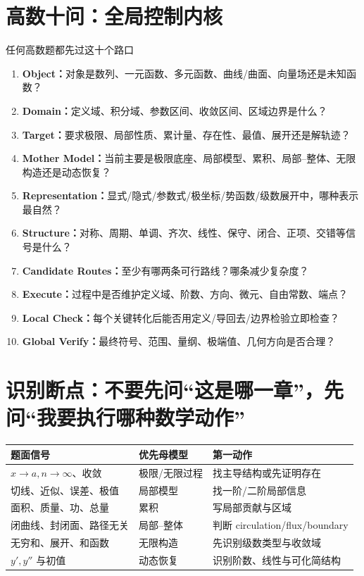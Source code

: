\documentclass[11pt,a4paper,openany]{ctexbook}
\newcommand{\key}[1]{\textbf{\color{deep}#1}}
\begin{document}
\section{高数十问：全局控制内核}
\begin{corebox}{任何高数题都先过这十个路口}
\begin{enumerate}
  \item \key{Object：}对象是数列、一元函数、多元函数、曲线/曲面、向量场还是未知函数？
  \item \key{Domain：}定义域、积分域、参数区间、收敛区间、区域边界是什么？
  \item \key{Target：}要求极限、局部性质、累计量、存在性、最值、展开还是解轨迹？
  \item \key{Mother Model：}当前主要是极限底座、局部模型、累积、局部--整体、无限构造还是动态恢复？
  \item \key{Representation：}显式/隐式/参数式/极坐标/势函数/级数展开中，哪种表示最自然？
  \item \key{Structure：}对称、周期、单调、齐次、线性、保守、闭合、正项、交错等信号是什么？
  \item \key{Candidate Routes：}至少有哪两条可行路线？哪条减少复杂度？
  \item \key{Execute：}过程中是否维护定义域、阶数、方向、微元、自由常数、端点？
  \item \key{Local Check：}每个关键转化后能否用定义/导回去/边界检验立即检查？
  \item \key{Global Verify：}最终符号、范围、量纲、极端值、几何方向是否合理？
\end{enumerate}
\end{corebox}

\section{识别断点：不要先问“这是哪一章”，先问“我要执行哪种数学动作”}
\begin{longtable}{L{3.0cm}L{5.0cm}L{\dimexpr\linewidth-8.17cm\relax}}
\toprule
\textbf{题面信号} & \textbf{优先母模型} & \textbf{第一动作}\\
\midrule
$x\to a,n\to\infty$、收敛 & 极限/无限过程 & 找主导结构或先证明存在\\
切线、近似、误差、极值 & 局部模型 & 找一阶/二阶局部信息\\
面积、质量、功、总量 & 累积 & 写局部贡献与区域\\
闭曲线、封闭面、路径无关 & 局部--整体 & 判断 circulation/flux/boundary\\
无穷和、展开、和函数 & 无限构造 & 先识别级数类型与收敛域\\
$y',y''$ 与初值 & 动态恢复 & 识别阶数、线性与可化简结构\\
\bottomrule
\end{longtable}
\end{document}
